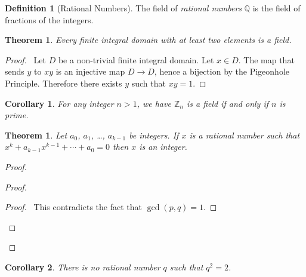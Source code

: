\documentclass{article}
\let\qed\relax
\newtheorem{theorem}[axiom]{Theorem}
\newtheorem{corollary}{Corollary}[axiom]
\theoremstyle{definition}
\newtheorem{definition}[axiom]{Definition}
\begin{document}
    \begin{definition}[Rational Numbers]
        The field of \emph{rational numbers} $\mathbb{Q}$ is the field of fractions of the integers.
    \end{definition}

    \begin{theorem}
        Every finite integral domain with at least two elements is a field.
    \end{theorem}

    \begin{proof}
        \pf\ Let $D$ be a non-trivial finite integral domain. Let $x \in D$. The map that sends $y$
        to $xy$ is an injective map $D \rightarrow D$, hence a bijection by the Pigeonhole Principle.
        Therefore there exists $y$ such that $xy = 1$. \qed
    \end{proof}

    \begin{corollary}
        For any integer $n > 1$, we have $\mathbb{Z}_n$ is a field if and only if $n$ is prime.
    \end{corollary}


    \begin{theorem}
        Let $a_0$, $a_1$, \ldots, $a_{k-1}$ be integers.
        If $x$ is a rational number such that $x^k + a_{k-1} x^{k-1} + \cdots + a_0 = 0$
        then $x$ is an integer.
    \end{theorem}

    \begin{proof}
        \pf
        \begin{proof}
            \qedstep
            \begin{proof}
                \pf\ This contradicts the fact that $\gcd(p,q) = 1$.
            \end{proof}
        \end{proof}
        \qed
    \end{proof}

    \begin{corollary}
        There is no rational number $q$ such that $q^2 = 2$.
    \end{corollary}
    
\end{document}

